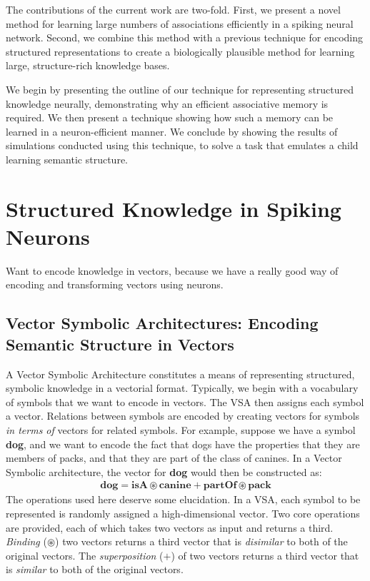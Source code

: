 \documentclass[10pt,letterpaper]{article}
\newcommand{\synset}[1]{\textbf{#1}}
\begin{document}
The contributions of the current work are two-fold. First, we present a novel method for learning large numbers of associations efficiently in a spiking neural network. Second, we combine this method with a previous technique for encoding structured representations to create a biologically plausible method for learning large, structure-rich knowledge bases.

We begin by presenting the outline of our technique for representing structured knowledge neurally, demonstrating why an efficient associative memory is required. We then present a technique showing how such a memory can be learned in a neuron-efficient manner. We conclude by showing the results of simulations conducted using this technique, to solve a task that emulates a child learning semantic structure.

\section{Structured Knowledge in Spiking Neurons}
Want to encode knowledge in vectors, because we have a really good way of encoding and transforming vectors using neurons.

\subsection{Vector Symbolic Architectures: Encoding Semantic Structure in Vectors}
A Vector Symbolic Architecture constitutes a means of representing structured, symbolic knowledge in a vectorial format. Typically, we begin with a vocabulary of symbols that we want to encode in vectors. The VSA then assigns each symbol a vector. Relations between symbols are encoded by creating vectors for symbols \textit{in terms of} vectors for related symbols. For example, suppose we have a symbol \synset{dog}, and we want to encode the fact that dogs have the properties that they are members of packs, and that they are part of the class of canines. In a Vector Symbolic architecture, the vector for \synset{dog} would then be constructed as:
\begin{align}
\mathbf{dog} = \mathbf{isA} \circledast \mathbf{canine} + \mathbf{partOf} \circledast \mathbf{pack}\label{eqn:dog-sem}
\end{align}
The operations used here deserve some elucidation. In a VSA, each symbol to be represented is randomly assigned a high-dimensional vector. Two core operations are provided, each of which takes two vectors as input and returns a third. \textit{Binding} ($\circledast$) two vectors returns a third vector that is \textit{disimilar} to both of the original vectors. The \textit{superposition} ($+$) of two vectors returns a third vector that is \textit{similar} to both of the original vectors. 
\end{document}
